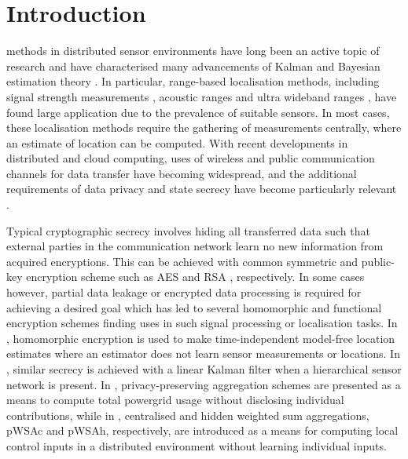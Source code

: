 \documentclass[10pt,letterpaper,oneside,twocolumn,journal]{IEEEtran}
\theoremstyle{definition}
\theoremstyle{definition}
\theoremstyle{remark}
\begin{document}
\section{Introduction} \label{sec:introduction}
 methods in distributed sensor environments have long been an active topic of research \cite{pierceIntroductionLoran1946,ligginsDistributedDataFusion2012,liContributedReviewSourcelocalization2016} and have characterised many advancements of Kalman and Bayesian estimation theory \cite{mutambaraDecentralizedEstimationControl1998}. In particular, range-based localisation methods, including signal strength measurements \cite{wangConvexCombinationSource2018,heRangeFreeLocalizationSchemes2003}, acoustic ranges \cite{beutlerNewNonlinearFiltering2004} and ultra wideband ranges \cite{geziciLocalizationUltraWidebandRadios2005}, have found large application due to the prevalence of suitable sensors. In most cases, these localisation methods require the gathering of measurements centrally, where an estimate of location can be computed. With recent developments in distributed and cloud computing, uses of wireless and public communication channels for data transfer have becoming widespread, and the additional requirements of data privacy and state secrecy have become particularly relevant \cite{brennerSecretProgramExecution2011,renSecurityChallengesPublic2012}.

Typical cryptographic secrecy involves hiding all transferred data such that external parties in the communication network learn no new information from acquired encryptions. This can be achieved with common symmetric and public-key encryption scheme such as AES \cite{gueronIntelAdvancedEncryption2010} and RSA \cite{rivestMethodObtainingDigital1978}, respectively. In some cases however, partial data leakage or encrypted data processing is required for achieving a desired goal which has led to several homomorphic and functional encryption schemes \cite{paillierPublicKeyCryptosystemsBased1999,shiPrivacyPreservingAggregationTimeSeries2011,joyeScalableSchemePrivacyPreserving2013,chotardDecentralizedMultiClientFunctional2018} finding uses in such signal processing or localisation tasks. In \cite{alanwarPrOLocResilientLocalization2017}, homomorphic encryption is used to make time-independent model-free location estimates where an estimator does not learn sensor measurements or locations. In \cite{aristovEncryptedMultisensorInformation2018}, similar secrecy is achieved with a linear Kalman filter when a hierarchical sensor network is present. In \cite{shiPrivacyPreservingAggregationTimeSeries2011,joyeScalableSchemePrivacyPreserving2013}, privacy-preserving aggregation schemes are presented as a means to compute total powergrid usage without disclosing individual contributions, while in \cite{alexandruEncryptedCooperativeControl2019,alexandruPrivateWeightedSum2020}, centralised and hidden weighted sum aggregations, pWSAc and pWSAh, respectively, are introduced as a means for computing local control inputs in a distributed environment without learning individual inputs.
\end{document}
